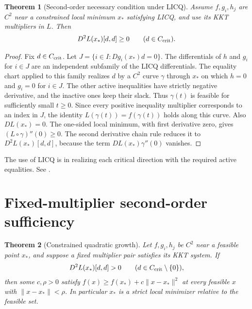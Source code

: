 \documentclass[11pt,oneside,openany]{book}
\theoremstyle{plain}
\newtheorem{theorem}{Theorem}[chapter]
\theoremstyle{definition}
\theoremstyle{remark}
\begin{document}
\begin{theorem}[Second-order necessary condition under LICQ]\label{thm:licq-second-order-necessity}
Assume \(f,g_i,h_j\) are \(C^2\) near a constrained
local minimum \(x_*\) satisfying LICQ, and use its
KKT multipliers in \(L\). Then
\[
 D^2L(x_*)[d,d]\ge0\qquad(d\in C_{\rm crit}).
\]
\end{theorem}

\begin{proof}
Fix \(d\in C_{\rm crit}\). Let
\(J=\{i\in I:Dg_i(x_*)d=0\}\).
The differentials of \(h\) and \(g_i\) for \(i\in J\)
are an independent subfamily of the LICQ
differentials. The equality chart applied to this
family realizes \(d\) by a \(C^2\) curve \(\gamma\)
through \(x_*\) on which \(h=0\) and \(g_i=0\) for
\(i\in J\). The other active inequalities have
strictly negative derivative, and the inactive
ones keep their slack. Thus \(\gamma(t)\) is
feasible for sufficiently small \(t\ge0\).
Since every positive inequality multiplier
corresponds to an index in \(J\), the identity
\(L(\gamma(t))=f(\gamma(t))\) holds along this
curve. Also \(DL(x_*)=0\).
The one-sided local minimum, with first derivative
zero, gives \((L\circ\gamma)''(0)\ge0\).
The second derivative chain rule reduces it to
\(D^2L(x_*)[d,d]\), because the term
\(DL(x_*)\gamma''(0)\) vanishes.
\end{proof}

The use of LICQ is in realizing each critical
direction with the required active equalities.
See \cite[Theorem 12.5]{NocedalWright}.

\section{Fixed-multiplier second-order sufficiency}
\label{v06-07}

\begin{theorem}[Constrained quadratic growth]\label{thm:constrained-growth}
Let \(f,g_i,h_j\) be \(C^2\) near a feasible point
\(x_*\), and suppose a fixed multiplier pair
satisfies its KKT system. If
\[
 D^2L(x_*)[d,d]>0
 \qquad(d\in C_{\rm crit}\setminus\{0\}),
\]
then some \(c,\rho>0\) satisfy
\(f(x)\ge f(x_*)+c\|x-x_*\|^2\) at every feasible
\(x\) with \(\|x-x_*\|<\rho\).
In particular \(x_*\) is a strict local minimizer
relative to the feasible set.
\end{theorem}
\end{document}
